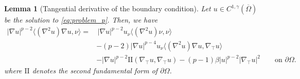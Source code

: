 \documentclass[10pt,a4paper, reqno]{amsart}
\numberwithin{equation}{section}
\newtheorem{lemma}[teo]{Lemma}
\begin{document}
\begin{lemma}[Tangential derivative of the boundary condition] \label{lem:tangential}
    Let $u \in C^{1,\gamma}(\overline{\Omega})$ be the solution to \eqref{eq:problem_p}. Then, we have
    \begin{equation*}
        \begin{aligned}
        |\nabla u|^{p-2}\langle(\nabla^2u)\nabla u,\nu\rangle = & \, |\nabla u|^{p-2} u_\nu \langle(\nabla^2u)\nu,\nu\rangle
        \\&-(p-2)|\nabla u|^{p-4} u_\nu \langle(\nabla^2u)\nabla u,\nabla_\top u\rangle
        \\&-|\nabla u|^{p-2} \mathrm{I\!I}(\nabla_\top u,\nabla_\top u)
        -(p-1)\beta|u|^{p-2} |\nabla_\top u|^{2} \qquad \text{on }\partial\Omega.
        \end{aligned}
    \end{equation*}
    where $\mathrm{I\!I}$ denotes the second fundamental form of $\partial\Omega$.
\end{lemma}
\end{document}
